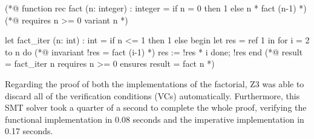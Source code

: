 \bigskip
\newcommand{\provername}[1]{\cellcolor{yellow!25}
\begin{sideways}\textbf{#1}~~\end{sideways}}
\newcommand{\explanation}[1]{\cellcolor{yellow!13}lemma \texttt{#1}}
\newcommand{\transformation}[1]{\cellcolor{yellow!13}transformation \texttt{#1}}
\newcommand{\subgoal}[2]{\cellcolor{yellow!13}subgoal #2}
\newcommand{\valid}[1]{\cellcolor{green!13}#1}
\newcommand{\unknown}[1]{\cellcolor{red!20}#1}
\newcommand{\invalid}[1]{\cellcolor{red!50}#1}
\newcommand{\timeout}[1]{\cellcolor{red!20}(#1)}
\newcommand{\outofmemory}[1]{\cellcolor{red!20}(#1)}
\newcommand{\noresult}{\multicolumn{1}{>{\columncolor[gray]{0.8}}c|}{~}}
\newcommand{\highfailure}{\cellcolor{red!50}FAILURE}
    
\begin{minipage}{\linewidth}
\begin{gospel}
  (*@ function rec fact (n: integer) : integer =
  if n = 0 then 1 else n * fact (n-1) *)
  (*@ requires n >= 0 
    variant n *)
\end{gospel}
\end{minipage}

\begin{minipage}{\linewidth}
\begin{ocamlenv}
  let fact_iter (n: int) : int =
    if n <= 1 then 1
    else
      begin 
        let res = ref 1 in
        for i = 2 to n do
          (*@ invariant !res = fact (i-1) *)
          res := !res * i
        done;
        !res
      end
  (*@ result = fact_iter n
    requires n >= 0 
    ensures result = fact n *)
\end{ocamlenv}
\end{minipage}

Regarding the proof of both the implementations of the factorial, Z3 was able to discard all of the verification conditions (VCs) automatically.
Furthermore, this SMT solver took a quarter of a second to complete the whole proof, verifying the functional implementation in 0.08 seconds and the imperative implementation in 0.17 seconds.

